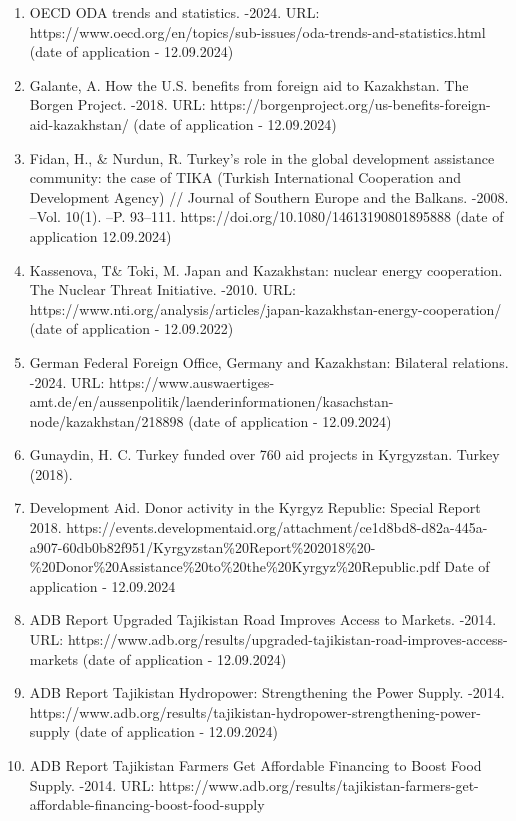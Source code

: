 \begin{enumerate}
\def\labelenumi{\arabic{enumi}.}
\item
  OECD ODA trends and statistics. -2024. URL:
  https://www.oecd.org/en/topics/sub-issues/oda-trends-and-statistics.html
  (date of application - 12.09.2024)
\item
  Galante, A. How the U.S. benefits from foreign aid to Kazakhstan. The
  Borgen Project. -2018. URL:
  https://borgenproject.org/us-benefits-foreign-aid-kazakhstan/ (date of
  application - 12.09.2024)
\item
  Fidan, H., \& Nurdun, R. Turkey's role in the global development
  assistance community: the case of TIKA (Turkish International
  Cooperation and Development Agency) // Journal of Southern Europe and
  the Balkans. -2008. --Vol. 10(1). --P. 93--111.
  https://doi.org/10.1080/14613190801895888 (date of application
  12.09.2024)
\item
  Kassenova, T\& Toki, M. Japan and Kazakhstan: nuclear energy
  cooperation. The Nuclear Threat Initiative. -2010. URL:
  https://www.nti.org/analysis/articles/japan-kazakhstan-energy-cooperation/
  (date of application - 12.09.2022)
\item
  German Federal Foreign Office, Germany and Kazakhstan: Bilateral
  relations. -2024. URL:
  https://www.auswaertiges-amt.de/en/aussenpolitik/laenderinformationen/kasachstan-node/kazakhstan/218898
  (date of application - 12.09.2024)
\item
  Gunaydin, H. C. Turkey funded over 760 aid projects in Kyrgyzstan.
  Turkey (2018).
\item
  Development Aid. Donor activity in the Kyrgyz Republic: Special Report
  2018.
  https://events.developmentaid.org/attachment/ce1d8bd8-d82a-445a-a907-60db0b82f951/Kyrgyzstan\%20Report\%202018\%20-\%20Donor\%20Assistance\%20to\%20the\%20Kyrgyz\%20Republic.pdf
  Date of application - 12.09.2024
\item
  ADB Report Upgraded Tajikistan Road Improves Access to Markets. -2014.
  URL:
  https://www.adb.org/results/upgraded-tajikistan-road-improves-access-markets
  (date of application - 12.09.2024)
\item
  ADB Report Tajikistan Hydropower: Strengthening the Power Supply.
  -2014.
  https://www.adb.org/results/tajikistan-hydropower-strengthening-power-supply
  (date of application - 12.09.2024)
\item
  ADB Report Tajikistan Farmers Get Affordable Financing to Boost Food
  Supply. -2014. URL:
  https://www.adb.org/results/tajikistan-farmers-get-affordable-financing-boost-food-supply

\end{enumerate}
